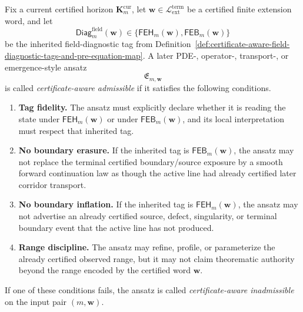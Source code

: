 \begin{definition}
\label{def:certificate-aware-admissibility-for-later-field-equation-ansatze}
Fix a current certified horizon \(\mathbf K_m^{\mathrm{cur}}\), let \(\mathbf w\in \mathcal L_{\mathrm{ext}}^{\mathrm{term}}\) be a certified finite extension word, and let
\[
  \mathsf{Diag}^{\mathrm{field}}_{m}(\mathbf w)
  \in
  \{\mathsf{FEH}_{m}(\mathbf w),\mathsf{FEB}_{m}(\mathbf w)\}
\]
be the inherited field-diagnostic tag from Definition~\ref{def:certificate-aware-field-diagnostic-tags-and-pre-equation-map}. A later PDE-, operator-, transport-, or emergence-style ansatz
\[
  \mathfrak E_{m,\mathbf w}
\]
is called \emph{certificate-aware admissible} if it satisfies the following conditions.
\begin{enumerate}[label=(\roman*)]
  \item \textbf{Tag fidelity.} The ansatz must explicitly declare whether it is reading the state under \(\mathsf{FEH}_{m}(\mathbf w)\) or under \(\mathsf{FEB}_{m}(\mathbf w)\), and its local interpretation must respect that inherited tag.
  \item \textbf{No boundary erasure.} If the inherited tag is \(\mathsf{FEB}_{m}(\mathbf w)\), the ansatz may not replace the terminal certified boundary/source exposure by a smooth forward continuation law as though the active line had already certified later corridor transport.
  \item \textbf{No boundary inflation.} If the inherited tag is \(\mathsf{FEH}_{m}(\mathbf w)\), the ansatz may not advertise an already certified source, defect, singularity, or terminal boundary event that the active line has not produced.
  \item \textbf{Range discipline.} The ansatz may refine, profile, or parameterize the already certified observed range, but it may not claim theorematic authority beyond the range encoded by the certified word \(\mathbf w\).
\end{enumerate}
If one of these conditions fails, the ansatz is called \emph{certificate-aware inadmissible} on the input pair \((m,\mathbf w)\).
\end{definition}

